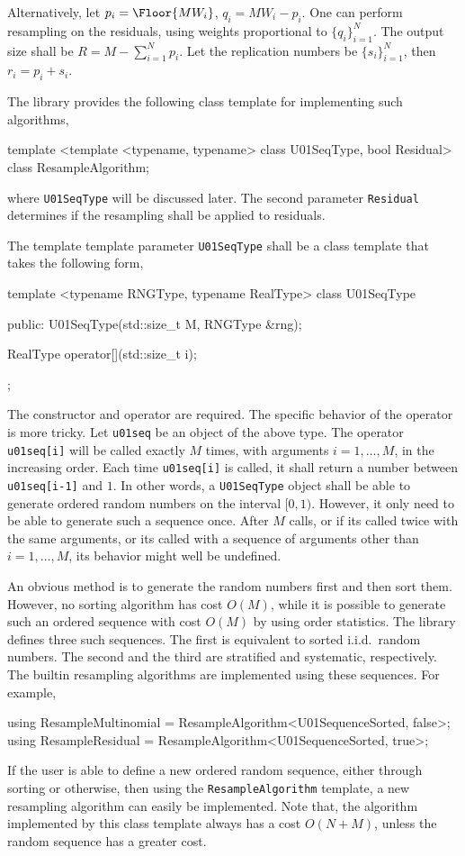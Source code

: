 Alternatively, let $p_i = \Floor{MW_i}$, $q_i = MW_i - p_i$. One can perform
resampling on the residuals, using weights proportional to $\{q_i\}_{i=1}^N$.
The output size shall be $R = M - \sum_{i=1}^N p_i$. Let the replication
numbers be $\{s_i\}_{i=1}^N$, then $r_i = p_i + s_i$.

The library provides the following class template for implementing such
algorithms,
\begin{cppcode}
  template <template <typename, typename> class U01SeqType, bool Residual>
  class ResampleAlgorithm;
\end{cppcode}
where \verb|U01SeqType| will be discussed later. The second parameter
\verb|Residual| determines if the resampling shall be applied to residuals.

The template template parameter \verb|U01SeqType| shall be a class template
that takes the following form,
\begin{cppcode}
  template <typename RNGType, typename RealType>
  class U01SeqType
  {
        public:
        U01SeqType(std::size_t M, RNGType &rng);

        RealType operator[](std::size_t i);
  };
\end{cppcode}
The constructor and operator are required. The specific behavior of the
operator is more tricky. Let \verb|u01seq| be an object of the above type. The
operator \verb|u01seq[i]| will be called exactly $M$ times, with arguments $i =
1,\dots,M$, in the increasing order. Each time \verb|u01seq[i]| is called, it
shall return a number between \verb|u01seq[i-1]| and $1$. In other words, a
\verb|U01SeqType| object shall be able to generate ordered random numbers on
the interval $[0, 1)$. However, it only need to be able to generate such a
sequence once. After $M$ calls, or if its called twice with the same arguments,
or its called with a sequence of arguments other than $i=1,\dots,M$, its
behavior might well be undefined.

An obvious method is to generate the random numbers first and then sort them.
However, no sorting algorithm has cost $O(M)$, while it is possible to generate
such an ordered sequence with cost $O(M)$ by using order statistics. The
library defines three such sequences. The first is equivalent to sorted i.i.d.\
random numbers. The second and the third are stratified and systematic,
respectively. The builtin resampling algorithms are implemented using these
sequences. For example,
\begin{cppcode}
  using ResampleMultinomial = ResampleAlgorithm<U01SequenceSorted, false>;
  using ResampleResidual = ResampleAlgorithm<U01SequenceSorted, true>;
\end{cppcode}
If the user is able to define a new ordered random sequence, either through
sorting or otherwise, then using the \verb|ResampleAlgorithm| template, a new
resampling algorithm can easily be implemented. Note that, the algorithm
implemented by this class template always has a cost $O(N + M)$, unless the
random sequence has a greater cost.

